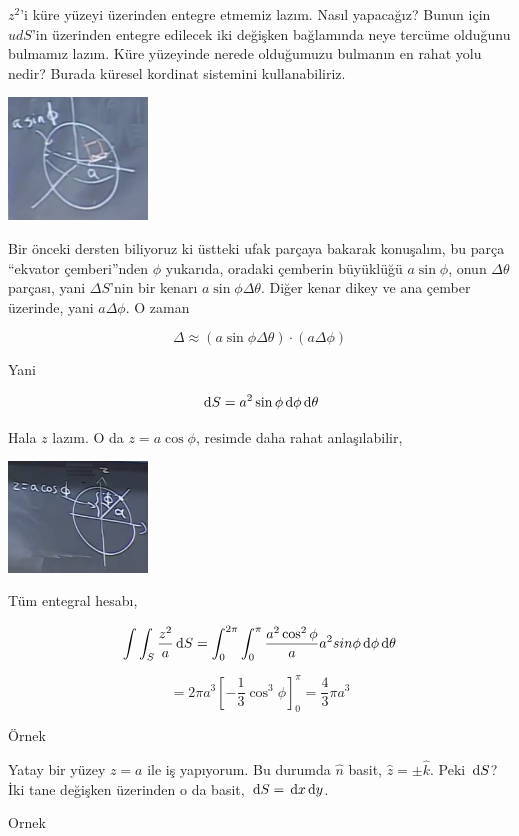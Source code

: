 \documentclass[12pt,fleqn]{article}\usepackage{../../common}
\begin{document}
$z^2$'i küre yüzeyi üzerinden entegre etmemiz lazım. Nasıl yapacağız?  Bunun
için $ud S$'in üzerinden entegre edilecek iki değişken bağlamında neye tercüme
olduğunu bulmamız lazım. Küre yüzeyinde nerede olduğumuzu bulmanın en rahat yolu
nedir? Burada küresel kordinat sistemini kullanabiliriz.

\includegraphics[width=10em]{calc_multi_27_05.png}

Bir önceki dersten biliyoruz ki üstteki ufak parçaya bakarak konuşalım, bu parça
``ekvator çemberi''nden $\phi$ yukarıda, oradaki çemberin büyüklüğü
$a\sin\phi$, onun $\Delta \theta$ parçası, yani $\Delta S$'nin bir kenarı
$a\sin\phi \Delta \theta$. Diğer kenar dikey ve ana çember üzerinde, yani
$a \Delta \phi$. O zaman

$$
\Delta  \approx (a\sin\phi \Delta \theta) \cdot (a \Delta \phi)
$$

Yani

$$
\,\mathrm{d} S = a^2 \sin\phi \,\mathrm{d} \phi \,\mathrm{d} \theta
$$

Hala $z$ lazım. O da $z = a \cos\phi$, resimde daha rahat anlaşılabilir,

\includegraphics[width=10em]{calc_multi_27_06.png}

Tüm entegral hesabı,

$$
\int \int_S \frac{z^2}{a} \,\mathrm{d} S =
\int_{0}^{2\pi} \int_{0}^{\pi} \frac{a^2 \cos^2 \phi}{a} a^2 sin\phi
\,\mathrm{d} \phi \,\mathrm{d} \theta
$$

$$
= 2\pi a^3 \left[ -\frac{1}{3} \cos^3 \phi  \right]_{0}^{\pi} =
\frac{4}{3} \pi a^3
$$

Örnek

Yatay bir yüzey $z = a$ ile iş yapıyorum. Bu durumda $\hat{n}$ basit,
$\hat{z} = \pm \hat{k}$. Peki $\,\mathrm{d} S$? İki tane değişken üzerinden
o da basit, $\,\mathrm{d} S = \,\mathrm{d} x \,\mathrm{d} y$.

Ornek
\end{document}
